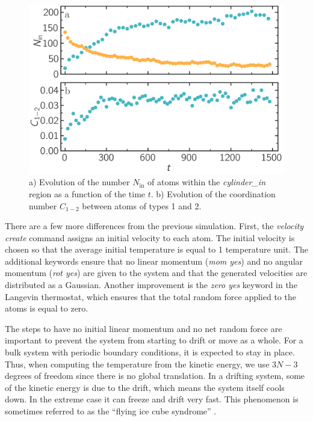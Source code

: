 \documentclass[9pt,tutorial]{livecoms}
\begin{document}
\begin{figure}
\centering
\includegraphics[width=\linewidth]{LJ-mixing}
\caption{a) Evolution of the number $N_\text{in}$ of atoms within the
\textit{cylinder\_in} region as a function of the time $t$. b) Evolution of
the coordination number $C_{1-2}$ between atoms of types 1 and 2.}
\label{fig:mixing}
\end{figure}

There are a few more differences from the previous simulation.  First,
the \textit{velocity create} command assigns an initial velocity to each
atom.  The initial velocity is chosen so that the average initial
temperature is equal to 1 temperature unit.  The additional keywords
ensure that no linear momentum (\textit{mom yes}) and no angular
momentum (\textit{rot yes}) are given to the system and that the
generated velocities are distributed as a Gaussian.  Another improvement
is the \textit{zero yes} keyword in the Langevin thermostat, which
ensures that the total random force applied to the atoms is equal to
zero.

The steps to have no initial linear momentum and no net random force are
important to prevent the system from starting to drift or move as a
whole.  For a bulk system with periodic boundary conditions, it is
expected to stay in place. Thus, when computing the temperature from
the kinetic energy, we use $3N-3$ degrees of freedom since there is no
global translation.  In a drifting system, some of the kinetic energy is
due to the drift, which means the system itself cools down.  In the
extreme case it can freeze and drift very fast. This phenomenon is sometimes referred to as the ``flying ice cube syndrome'' \cite{wong2016good}.
\end{document}
